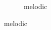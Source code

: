 \documentclass{article} %
\begin{document}
\begin{figure}
\begin{preview}
\begin{subfigure}[b]{.3\linewidth}
	\vspace*{-1.8em}
        \caption{\sffamily melodic}
      \end{subfigure}
\end{preview}
\end{figure}
\end{document}

